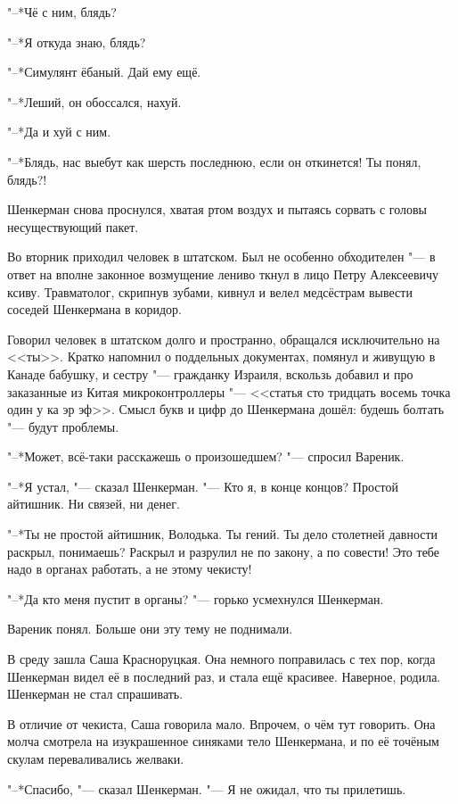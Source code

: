 "--*Чё с ним, блядь?

"--*Я откуда знаю, блядь?

"--*Симулянт ёбаный.
Дай ему ещё.

"--*Леший, он обоссался, нахуй.

"--*Да и хуй с ним.

"--*Блядь, нас выебут как шерсть последнюю, если он откинется!
Ты понял, блядь?!

Шенкерман снова проснулся, хватая ртом воздух и пытаясь сорвать с головы несуществующий пакет.

\label{Tue_2012_09_04}

Во вторник приходил человек в штатском.
Был не особенно обходителен "--- в ответ на вполне законное возмущение лениво ткнул в лицо Петру Алексеевичу ксиву.
Травматолог, скрипнув зубами, кивнул и велел медсёстрам вывести соседей Шенкермана в коридор.

Говорил человек в штатском долго и пространно, обращался исключительно на <<ты>>.
Кратко напомнил о поддельных документах, помянул и живущую в Канаде бабушку, и сестру "--- гражданку Израиля, вскользь добавил и про заказанные из Китая микроконтроллеры "--- <<статья сто тридцать восемь точка один у ка эр эф>>.
Смысл букв и цифр до Шенкермана дошёл: будешь болтать "--- будут проблемы.

"--*Может, всё-таки расскажешь о произошедшем? "--- спросил Вареник.

"--*Я устал, "--- сказал Шенкерман.
"--- Кто я, в конце концов?
Простой айтишник.
Ни связей, ни денег.

"--*Ты не простой айтишник, Володька.
Ты гений.
Ты дело столетней давности раскрыл, понимаешь?
Раскрыл и разрулил не по закону, а по совести!
Это тебе надо в органах работать, а не этому чекисту!

"--*Да кто меня пустит в органы? "--- горько усмехнулся Шенкерман.

Вареник понял.
Больше они эту тему не поднимали.

\label{Wed_2012_09_05}

В среду зашла Саша Красноруцкая.
Она немного поправилась с тех пор, когда Шенкерман видел её в последний раз, и стала ещё красивее.
Наверное, родила.
Шенкерман не стал спрашивать.

В отличие от чекиста, Саша говорила мало.
Впрочем, о чём тут говорить.
Она молча смотрела на изукрашенное синяками тело Шенкермана, и по её точёным скулам переваливались желваки.

"--*Спасибо, "--- сказал Шенкерман.
"--- Я не ожидал, что ты прилетишь.

